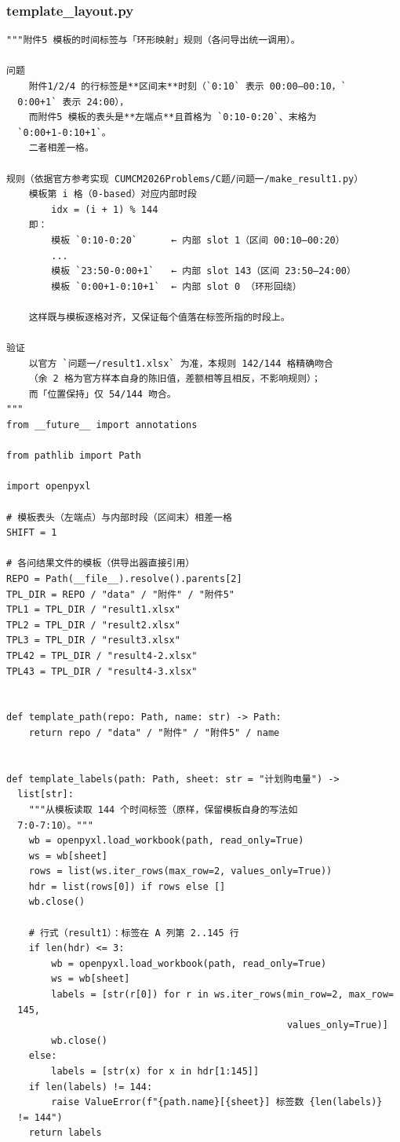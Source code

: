 \subsubsection*{template\_layout.py}
\begin{verbatim}
"""附件5 模板的时间标签与「环形映射」规则（各问导出统一调用）。

问题
    附件1/2/4 的行标签是**区间末**时刻（`0:10` 表示 00:00–00:10，`
  0:00+1` 表示 24:00），
    而附件5 模板的表头是**左端点**且首格为 `0:10-0:20`、末格为
  `0:00+1-0:10+1`。
    二者相差一格。

规则（依据官方参考实现 CUMCM2026Problems/C题/问题一/make_result1.py）
    模板第 i 格（0-based）对应内部时段
        idx = (i + 1) % 144
    即：
        模板 `0:10-0:20`      ← 内部 slot 1（区间 00:10–00:20）
        ...
        模板 `23:50-0:00+1`   ← 内部 slot 143（区间 23:50–24:00）
        模板 `0:00+1-0:10+1`  ← 内部 slot 0 （环形回绕）

    这样既与模板逐格对齐，又保证每个值落在标签所指的时段上。

验证
    以官方 `问题一/result1.xlsx` 为准，本规则 142/144 格精确吻合
    （余 2 格为官方样本自身的陈旧值，差额相等且相反，不影响规则）；
    而「位置保持」仅 54/144 吻合。
"""
from __future__ import annotations

from pathlib import Path

import openpyxl

# 模板表头（左端点）与内部时段（区间末）相差一格
SHIFT = 1

# 各问结果文件的模板（供导出器直接引用）
REPO = Path(__file__).resolve().parents[2]
TPL_DIR = REPO / "data" / "附件" / "附件5"
TPL1 = TPL_DIR / "result1.xlsx"
TPL2 = TPL_DIR / "result2.xlsx"
TPL3 = TPL_DIR / "result3.xlsx"
TPL42 = TPL_DIR / "result4-2.xlsx"
TPL43 = TPL_DIR / "result4-3.xlsx"


def template_path(repo: Path, name: str) -> Path:
    return repo / "data" / "附件" / "附件5" / name


def template_labels(path: Path, sheet: str = "计划购电量") ->
  list[str]:
    """从模板读取 144 个时间标签（原样，保留模板自身的写法如
  7:0-7:10）。"""
    wb = openpyxl.load_workbook(path, read_only=True)
    ws = wb[sheet]
    rows = list(ws.iter_rows(max_row=2, values_only=True))
    hdr = list(rows[0]) if rows else []
    wb.close()

    # 行式（result1）：标签在 A 列第 2..145 行
    if len(hdr) <= 3:
        wb = openpyxl.load_workbook(path, read_only=True)
        ws = wb[sheet]
        labels = [str(r[0]) for r in ws.iter_rows(min_row=2, max_row=
  145,
                                                  values_only=True)]
        wb.close()
    else:
        labels = [str(x) for x in hdr[1:145]]
    if len(labels) != 144:
        raise ValueError(f"{path.name}[{sheet}] 标签数 {len(labels)}
  != 144")
    return labels



\end{verbatim}
